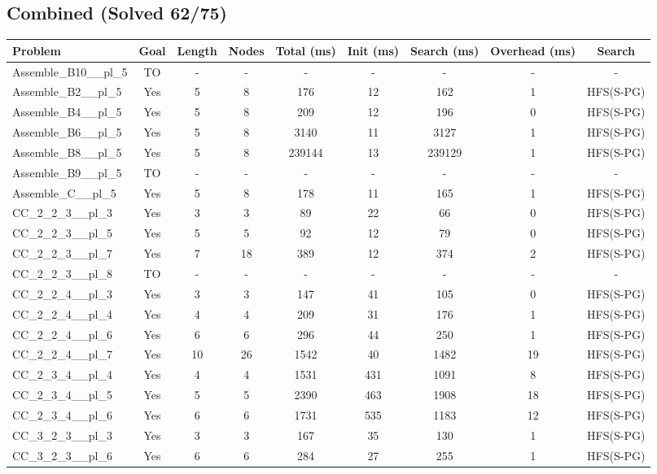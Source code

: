 \documentclass{article}
\begin{document}
\subsection*{Combined (Solved 62/75)}
\begin{tabular}{lcccccccc}
\toprule
Problem & Goal & Length & Nodes & Total (ms) & Init (ms) & Search (ms) & Overhead (ms) & Search \\
\midrule
Assemble\_B10\_\_pl\_5 & TO & - & - & - & - & - & - & - \\
Assemble\_B2\_\_pl\_5 & Yes & 5 & 8 & 176 & 12 & 162 & 1 & HFS(S-PG) \\
Assemble\_B4\_\_pl\_5 & Yes & 5 & 8 & 209 & 12 & 196 & 0 & HFS(S-PG) \\
Assemble\_B6\_\_pl\_5 & Yes & 5 & 8 & 3140 & 11 & 3127 & 1 & HFS(S-PG) \\
Assemble\_B8\_\_pl\_5 & Yes & 5 & 8 & 239144 & 13 & 239129 & 1 & HFS(S-PG) \\
Assemble\_B9\_\_pl\_5 & TO & - & - & - & - & - & - & - \\
Assemble\_C\_\_pl\_5 & Yes & 5 & 8 & 178 & 11 & 165 & 1 & HFS(S-PG) \\
CC\_2\_2\_3\_\_pl\_3 & Yes & 3 & 3 & 89 & 22 & 66 & 0 & HFS(S-PG) \\
CC\_2\_2\_3\_\_pl\_5 & Yes & 5 & 5 & 92 & 12 & 79 & 0 & HFS(S-PG) \\
CC\_2\_2\_3\_\_pl\_7 & Yes & 7 & 18 & 389 & 12 & 374 & 2 & HFS(S-PG) \\
CC\_2\_2\_3\_\_pl\_8 & TO & - & - & - & - & - & - & - \\
CC\_2\_2\_4\_\_pl\_3 & Yes & 3 & 3 & 147 & 41 & 105 & 0 & HFS(S-PG) \\
CC\_2\_2\_4\_\_pl\_4 & Yes & 4 & 4 & 209 & 31 & 176 & 1 & HFS(S-PG) \\
CC\_2\_2\_4\_\_pl\_6 & Yes & 6 & 6 & 296 & 44 & 250 & 1 & HFS(S-PG) \\
CC\_2\_2\_4\_\_pl\_7 & Yes & 10 & 26 & 1542 & 40 & 1482 & 19 & HFS(S-PG) \\
CC\_2\_3\_4\_\_pl\_4 & Yes & 4 & 4 & 1531 & 431 & 1091 & 8 & HFS(S-PG) \\
CC\_2\_3\_4\_\_pl\_5 & Yes & 5 & 5 & 2390 & 463 & 1908 & 18 & HFS(S-PG) \\
CC\_2\_3\_4\_\_pl\_6 & Yes & 6 & 6 & 1731 & 535 & 1183 & 12 & HFS(S-PG) \\
CC\_3\_2\_3\_\_pl\_3 & Yes & 3 & 3 & 167 & 35 & 130 & 1 & HFS(S-PG) \\
CC\_3\_2\_3\_\_pl\_6 & Yes & 6 & 6 & 284 & 27 & 255 & 1 & HFS(S-PG) \\

\end{tabular}
\end{document}
